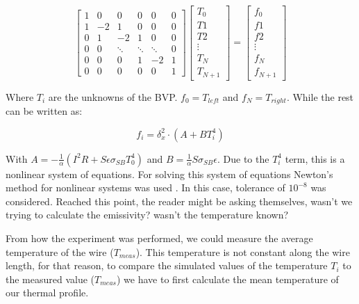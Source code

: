 \begin{equation}
    \begin{bmatrix}
   1 &  0 & 0 & 0 & 0 & 0\\
   1 & -2 & 1 & 0 & 0 & 0\\
   0 & 1 & -2 & 1 & 0 & 0\\
   0 & 0 & \ddots & \ddots & \ddots & 0 \\
   0 & 0 & 0 & 1 & -2 & 1 \\
   0 & 0 & 0 & 0 & 0 & 1
   \end{bmatrix}
   \begin{bmatrix}
       T_0 \\ T1 \\ T2 \\ \vdots \\ T_N \\ T_{N+1}
   \end{bmatrix}
    = 
\begin{bmatrix}
   f_0 \\ f1 \\ f2 \\ \vdots \\ f_N \\ f_{N+1}
\end{bmatrix}
\end{equation}

Where $T_i$ are the unknowns of the BVP. $f_0 = T_{left}$ and $f_N = T_{right}$. While the rest can be written as:

\begin{equation}
    f_i = \delta^2_x \cdot \left( A + B T^4_i \right)
\end{equation}

With $A = -\frac{1}{\alpha}\left(I^2 R + S\epsilon \sigma_{SB}T_0^4\right)$ and $B = \frac{1}{\alpha}S \sigma_{SB}\epsilon$. Due to the $T_i^4$ term, this is a nonlinear system of equations. For solving this system of equations Newton's method for nonlinear systems was used \parencite[][]{ref:AlvaroBook}. In this case, tolerance of $10^{-8}$ was considered. Reached this point, the reader might be asking themselves, wasn't we trying to calculate the emissivity? wasn't the temperature known? 

From how the experiment was performed, we could measure the average temperature of the wire ($T_{meas}$). This temperature is not constant along the wire length, for that reason, to compare the simulated values of the temperature $T_{i}$ to the measured value ($T_{meas}$) we have to first calculate the mean temperature of our thermal profile. 

